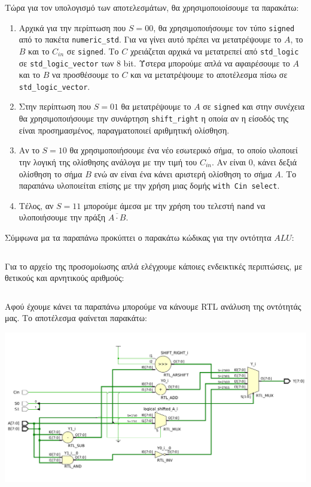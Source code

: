 \documentclass[11pt, a4paper]{report}
\begin{document}
Τώρα για τον υπολογισμό των αποτελεσμάτων, θα χρησιμοποιοίσουμε τα παρακάτω:
\begin{enumerate}
	\item Αρχικά για την περίπτωση που $S = 00$, θα χρησιμοποιήσουμε τον τύπο \texttt{signed} από το πακέτα \texttt{numeric_std}.
	      Για να γίνει αυτό πρέπει να μετατρέψουμε το $A$, το $B$ και το $C_{in}$ σε \texttt{signed}.
	      Το $C$ χρειάζεται αρχικά να μετατρεπεί από \texttt{std_logic} σε \texttt{std_logic_vector} των 8 bit.
	      Ύστερα μπορούμε απλά να αφαιρέσουμε το $A$ και το $B$ να προσθέσουμε το $C$ και να μετατρέψουμε το αποτέλεσμα πίσω σε \texttt{std_logic_vector}.
	\item Στην περίπτωση που $S = 01$ θα μετατρέψουμε το $A$ σε \texttt{signed} και στην συνέχεια θα χρησιμοποιήσουμε την συνάρτηση
	      \texttt{shift_right} η οποία αν η είσοδός της είναι προσημασμένος, παραγματοποιεί αριθμητική ολίσθηση.
	\item Αν το $S = 10$ θα χρησιμοποιήσουμε ένα νέο εσωτερικό σήμα, το οποίο υλοποιεί την λογική της ολίσθησης ανάλογα με την τιμή του $C_{in}$.
	      Αν είναι 0, κάνει δεξιά ολίσθηση το σήμα $B$ ενώ αν είναι ένα κάνει αριστερή ολίσθηση το σήμα $A$. Το παραπάνω υλοποιείται επίσης με την χρήση μιας δομής \texttt{with Cin select}.
	\item Τέλος, αν $S = 11$ μπορούμε άμεσα με την χρήση του τελεστή \texttt{nand} να υλοποιήσουμε την πράξη $\overline{A \cdot B}$.
\end{enumerate}

Σύμφωνα μα τα παραπάνω προκύπτει ο παρακάτω κώδικας για την οντότητα $ALU$:
\inputminted[breaklines, linenos]{vhdl}{./code/part-2/alu-1/alu.vhdl}

Για το αρχείο της προσομοίωσης απλά ελέγχουμε κάποιες ενδεικτικές περιπτώσεις, με θετικούς και αρνητικούς αριθμούς:
\inputminted[breaklines, linenos]{vhdl}{./code/part-2/alu-1/alu_tb.vhdl}

\newpage

Αφού έχουμε κάνει τα παραπάνω μπορούμε να κάνουμε RTL ανάλυση της οντότητάς μας. Το αποτέλεσμα φαίνεται παρακάτω:
\begin{center}
	\includegraphics[width=\textwidth]{./images/alu-1/RLT_ALU.png}
\end{center}
\end{document}
